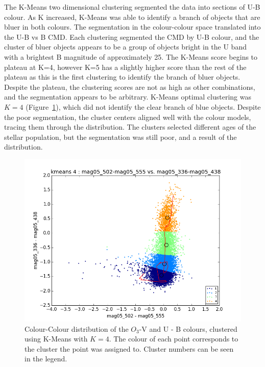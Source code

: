 The K-Means two dimensional clustering segmented the data into sections of U-B colour.
As K increased, K-Means was able to identify a branch of objects that are bluer in both colours.
The segmentation in the colour-colour space translated into the U-B vs B CMD. 
Each clustering segmented the CMD by U-B colour, and the cluster of bluer objects appears to be a group of objects bright in the U band with a brightest B magnitude of approximately 25.
The K-Means score begins to plateau at K=4, however K=5 has a slightly higher score than the rest of the plateau as this is the first clustering to identify the branch of bluer objects.
Despite the plateau, the clustering scores are not as high as other combinations, and the segmentation appears to be arbitrary.
K-Means optimal clustering was $K=4$ (Figure~\ref{fig:OIIIV2dKM}), which did not identify the clear branch of blue objects.
Despite the poor segmentation, the cluster centers aligned well with the colour models, tracing them through the distribution.
The clusters selected different ages of the stellar population, but the segmentation was still poor, and a result of the distribution. 

\begin{figure}
\centering
\includegraphics[width=\linewidth]{figs/unsuccessful/kmeans_color_4cl_mag05_502-mag05_555vsmag05_336-mag05_438}
\caption{Colour-Colour distribution of the $O_{3}$-V and U - B colours, clustered using K-Means with $K=4$. The colour of each point corresponds to the cluster the point was assigned to. Cluster numbers can be seen in the legend.}
\label{fig:OIIIV2dKM}
\end{figure}

